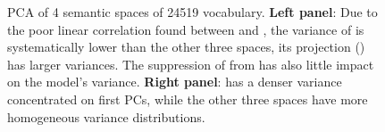 \begin{figure}
    \centering
    \caption[EVR of 4 French Semantic Spaces]{PCA of 4 semantic spaces of 24519 vocabulary. \textbf{Left panel}: Due to the poor linear correlation found between  and , the variance of  is systematically lower than the other three spaces, its projection () has larger variances. The suppression of  from  has also little impact on the model's variance. \textbf{Right panel}:  has a denser variance concentrated on first PCs, while the other three spaces have more homogeneous variance distributions.\label{fig:FreDecorVarRatio}} 
    
\end{figure}

